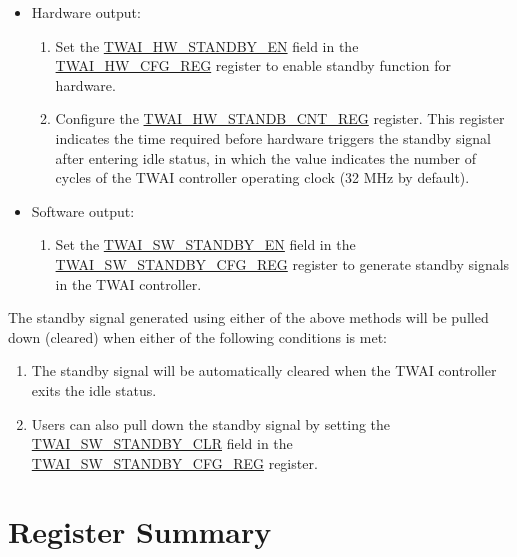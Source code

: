 \documentclass[main\_\_EN.tex]{subfiles}
\begin{document}
\begin{itemize}
    \item Hardware output:
    \begin{enumerate}
        \item Set the \hyperref[fielddesc:TWAIHWSTANDBYEN]{TWAI\_HW\_STANDBY\_EN} field in the \hyperref[regdesc:TWAIHWCFGREG]{TWAI\_HW\_CFG\_REG} register to enable standby function for hardware.
        \item Configure the \hyperref[regdesc:TWAIHWSTANDBYCNTREG]{TWAI\_HW\_STANDB\_CNT\_REG} register. This register indicates the time required before hardware triggers the standby signal after entering idle status, in which the value indicates the number of cycles of the TWAI controller operating clock (32 MHz by default).
    \end{enumerate}
    \item Software output:
    \begin{enumerate}
        \item Set the \hyperref[fielddesc:TWAISWSTANDBYEN]{TWAI\_SW\_STANDBY\_EN} field in the \hyperref[regdesc:TWAISWSTANDBYCFGREG]{TWAI\_SW\_STANDBY\_CFG\_REG} register to generate standby signals in the TWAI controller.
    \end{enumerate}
\end{itemize}

The standby signal generated using either of the above methods will be pulled down (cleared) when either of the following conditions is met:
\begin{enumerate}
    \item The standby signal will be automatically cleared when the TWAI controller exits the idle status.
    \item Users can also pull down the standby signal by setting the \hyperref[fielddesc:TWAISWSTANDBYCLR]{TWAI\_SW\_STANDBY\_CLR} field in the \hyperref[regdesc:TWAISWSTANDBYCFGREG]{TWAI\_SW\_STANDBY\_CFG\_REG} register.
\end{enumerate}




\clearpage
\hypertarget{twai-reg-summ}{}
\section{Register Summary}
\label{sec:twai-reg-summ}
\end{document}
